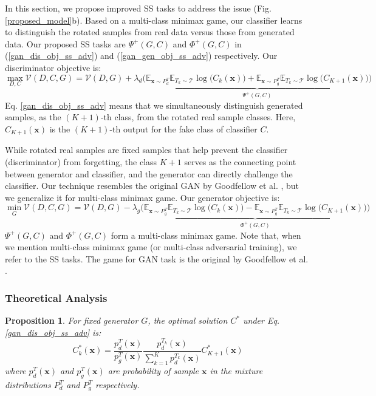 \documentclass{article}
\newtheorem{proposition}{Proposition}
\begin{document}
In this section, we propose improved SS tasks to address the issue (Fig. \ref{proposed_model}b).
Based on a multi-class minimax game, our classifier learns to distinguish the rotated samples from real data versus those from generated data. 
Our proposed SS tasks are  
$\Psi^+(G,C)$ and $\Phi^+(G, C)$ in (\ref{gan_dis_obj_ss_adv}) and (\ref{gan_gen_obj_ss_adv}) respectively.
Our discriminator objective is: 
\begin{equation}
\max_{D,C}\mathcal{V}(D,C,G) = \mathcal{V}(D,G) + \lambda_d \underbrace{\bigg(\mathbb{E}_{\mathbf{x} \sim {P_d^T}}\mathbb{E}_{T_k \sim \mathcal{T}}\log\Big(C_k(\mathbf{x})\Big) + \mathbb{E}_{\mathbf{x} \sim {P_g^T}}\mathbb{E}_{T_k \sim \mathcal{T}}\log\Big(C_{K+1}(\mathbf{x})\Big)\bigg)}_{\Psi^+(G,C)}
\label{gan_dis_obj_ss_adv}
\end{equation}
Eq. \ref{gan_dis_obj_ss_adv} means that we simultaneously distinguish generated samples, as the $(K + 1)$-th class, from the rotated real sample classes. Here, $C_{K+1}(\mathbf{x})$ is the $(K+1)$-th output for the fake class of classifier $C$. 

While rotated real samples are fixed samples that help prevent the classifier (discriminator) from forgetting, the class $K+1$ serves as the connecting point between generator and classifier, and the generator can directly challenge the classifier. Our technique resembles the original GAN by Goodfellow et al. \cite{goodfellow-nisp-2014}, but we generalize it for multi-class minimax game. Our generator objective is:
\begin{equation}
\min_G\mathcal{V}(D,C,G) = \mathcal{V}(D,G) - \lambda_g \underbrace{\bigg(\mathbb{E}_{\mathbf{x} \sim {P_g^T}}\mathbb{E}_{T_k \sim \mathcal{T}}\log\Big(C_k(\mathbf{x})\Big) - \mathbb{E}_{\mathbf{x} \sim P_g^T}\mathbb{E}_{T_k \sim \mathcal{T}}\log\Big(C_{K+1}(\mathbf{x})\Big)\bigg)}_{\Phi^+(G,C)}
\label{gan_gen_obj_ss_adv}
\end{equation}
$\Psi^+(G,C)$ and $\Phi^+(G,C)$ form a multi-class minimax game.
Note that, when we mention multi-class minimax game (or multi-class adversarial training), we refer to the SS tasks. The game for GAN task is the original by Goodfellow et al. \cite{goodfellow-nisp-2014}.  

\subsubsection{Theoretical Analysis}

\begin{proposition}
For fixed generator $G$, the optimal solution $C^*$ under Eq. \ref{gan_dis_obj_ss_adv} is:
\begin{equation}
C^*_k(\mathbf{x}) = \frac{p_d^T(\mathbf{x})}{p_g^T(\mathbf{x})}\frac{p_d^{T_k}(\mathbf{x})}{\sum_{k=1}^{K}p_d^{T_k}(\mathbf{x})} C^*_{K+1}(\mathbf{x})
\label{optimal_c_d_adv}
\end{equation} 
where $p_d^T(\mathbf{x})$ and $p_g^T(\mathbf{x})$ are probability of sample $\mathbf{x}$ in the mixture distributions $P_d^T$ and $P_g^T$ respectively.
\label{prop_2}
\end{proposition}
\end{document}
